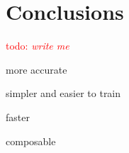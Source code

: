\documentclass{article}
\newcommand{\todo}[1]{\textcolor{red}{todo: {\em #1}}}
\begin{document}

\section{Conclusions}

\todo{write me}

more accurate

simpler and easier to train

faster

composable



\end{document}
